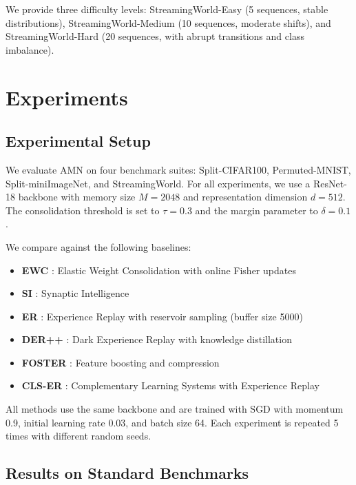 \documentclass[11pt]{article}
\begin{document}
We provide three difficulty levels: StreamingWorld-Easy (5 sequences, stable distributions), StreamingWorld-Medium (10 sequences, moderate shifts), and StreamingWorld-Hard (20 sequences, with abrupt transitions and class imbalance).

\section{Experiments}
\label{sec:experiments}

\subsection{Experimental Setup}

We evaluate AMN on four benchmark suites: Split-CIFAR100, Permuted-MNIST, Split-miniImageNet, and StreamingWorld. For all experiments, we use a ResNet-18 backbone with memory size $M = 2048$ and representation dimension $d = 512$. The consolidation threshold is set to $\tau = 0.3$ and the margin parameter to $\delta = 0.1$.

We compare against the following baselines:
\begin{itemize}
    \item \textbf{EWC} \citep{kirkpatrick2017overcoming}: Elastic Weight Consolidation with online Fisher updates
    \item \textbf{SI} \citep{zenke2017continual}: Synaptic Intelligence
    \item \textbf{ER} \citep{rolnick2019experience}: Experience Replay with reservoir sampling (buffer size 5000)
    \item \textbf{DER++} \citep{buzzega2020dark}: Dark Experience Replay with knowledge distillation
    \item \textbf{FOSTER} \citep{wang2022foster}: Feature boosting and compression
    \item \textbf{CLS-ER} \citep{arani2022learning}: Complementary Learning Systems with Experience Replay
\end{itemize}

All methods use the same backbone and are trained with SGD with momentum 0.9, initial learning rate 0.03, and batch size 64. Each experiment is repeated 5 times with different random seeds.

\subsection{Results on Standard Benchmarks}
\end{document}

